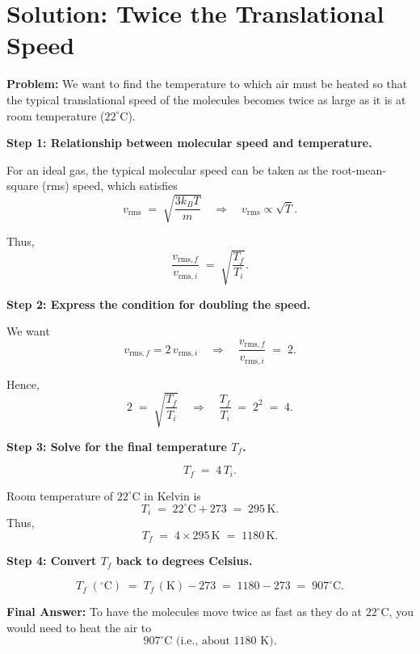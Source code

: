 \documentclass[12pt]{article}
\theoremstyle{definition} %
\theoremstyle{plain} %
\begin{document}
\section*{Solution: Twice the Translational Speed}

\noindent
\textbf{Problem:}
We want to find the temperature to which air must be heated so that the typical translational speed of the molecules becomes twice as large as it is at room temperature ($22^\circ\mathrm{C}$).

\vspace{1em}
\noindent
\textbf{Step 1: Relationship between molecular speed and temperature.}

For an ideal gas, the typical molecular speed can be taken as the root-mean-square (rms) speed, which satisfies
\[
v_{\mathrm{rms}} \;=\; \sqrt{\frac{3k_B T}{m}}
\quad\Longrightarrow\quad
v_{\mathrm{rms}} \propto \sqrt{T}.
\]

\noindent
Thus,
\[
\frac{v_{\mathrm{rms},f}}{v_{\mathrm{rms},i}} 
\;=\;
\sqrt{\frac{T_f}{T_i}}.
\]

\vspace{1em}
\noindent
\textbf{Step 2: Express the condition for doubling the speed.}

We want
\[
v_{\mathrm{rms},f} = 2\,v_{\mathrm{rms},i}
\quad\Longrightarrow\quad
\frac{v_{\mathrm{rms},f}}{v_{\mathrm{rms},i}} 
\;=\; 2.
\]

\noindent
Hence,
\[
2 
\;=\;
\sqrt{\frac{T_f}{T_i}}
\quad\Longrightarrow\quad
\frac{T_f}{T_i}
\;=\; 
2^2 
\;=\; 
4.
\]

\vspace{1em}
\noindent
\textbf{Step 3: Solve for the final temperature $T_f$.}

\[
T_f 
\;=\; 
4\,T_i.
\]

\noindent
Room temperature of $22^\circ\mathrm{C}$ in Kelvin is
\[
T_i 
\;=\;
22^\circ\mathrm{C} + 273
\;=\;
295\,\mathrm{K}.
\]
Thus,
\[
T_f
\;=\; 
4 \times 295\,\mathrm{K}
\;=\; 
1180\,\mathrm{K}.
\]

\vspace{1em}
\noindent
\textbf{Step 4: Convert $T_f$ back to degrees Celsius.}

\[
T_f\;(^\circ\mathrm{C}) 
\;=\; 
T_f\,(\mathrm{K}) - 273
\;=\; 
1180 - 273
\;=\; 
907^\circ\mathrm{C}.
\]

\vspace{1em}
\noindent
\textbf{Final Answer:}
To have the molecules move twice as fast as they do at $22^\circ\mathrm{C}$, you would need to heat the air to 
\[
\boxed{907^\circ\mathrm{C} \text{ (i.e., about } 1180\text{ K}).}
\]
\end{document}
